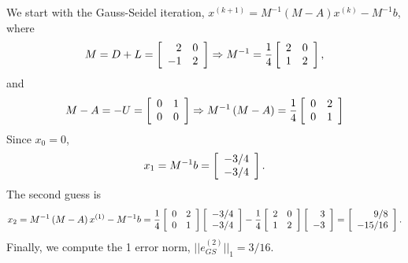 \begin{questions}
\begin{solution}
\begin{itemize}
We start with the Gauss-Seidel iteration, $x^{(k+1)}=M^{-1}\left(M-A\right)x^{(k)}-M^{-1}b$, where
\begin{align*}
M=D+L=\left[
	\begin{array}{r r} 
	2 & 0 \\
	-1 & 2 \\
	\end{array} \right]\Rightarrow M^{-1}=\frac{1}{4}\left[
	\begin{array}{r r} 
	2 & 0 \\
	1 & 2 \\
	\end{array} \right],
\end{align*}
and 
\begin{align*}
M-A=-U=\left[
	\begin{array}{r r} 
	0 & 1 \\
	0 & 0 \\
	\end{array} \right]\Rightarrow M^{-1}\left(M-A\right)=\frac{1}{4}\left[
	\begin{array}{r r} 
	0 & 2 \\
	0 & 1 \\
	\end{array} \right]
\end{align*}
Since $x_0=0$,
\begin{align*}
x_1=M^{-1}b=\left[
	\begin{array}{r r} 
	-3/4 \\
	-3/4 \\
	\end{array} \right].
\end{align*}
The second guess is
\begin{align*}
x_2=M^{-1}\left(M-A\right)x^{(1)}-M^{-1}b=\frac{1}{4}\left[
	\begin{array}{r r} 
	0 & 2 \\
	0 & 1 \\
	\end{array} \right]\left[
	\begin{array}{r r} 
	-3/4 \\
	-3/4 \\
	\end{array} \right]-\frac{1}{4}\left[
	\begin{array}{r r} 
	2 & 0 \\
	1 & 2 \\
	\end{array} \right]\left[
	\begin{array}{r r} 
	3 \\
	-3 \\
	\end{array} \right]=\left[
	\begin{array}{r r} 
	9/8 \\
	-15/16 \\
	\end{array} \right].
\end{align*}
Finally, we compute the 1 error norm, $||e_{GS}^{(2)}||_1=3/16$.

\end{itemize}
\end{solution}
\end{questions}
